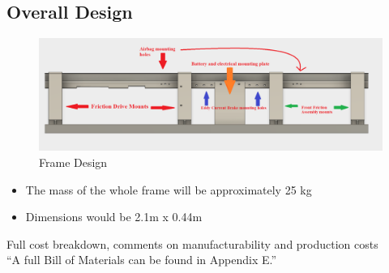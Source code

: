 \documentclass[main.tex]{subfiles}
\begin{document}
    \subsection{Overall Design}
    \begin{figure}
        \centering
        \includegraphics[width=\linewidth]{images/fig24}
        \caption{Frame Design}
        \label{fig:frame-design}
    \end{figure}
    \begin{itemize}
        \item The mass of the whole frame will be approximately 25 kg
        \item Dimensions would be 2.1m x 0.44m
    \end{itemize}
    Full cost breakdown, comments on manufacturability and production costs\\
    “A full Bill of Materials can be found in Appendix E.”
\end{document}

